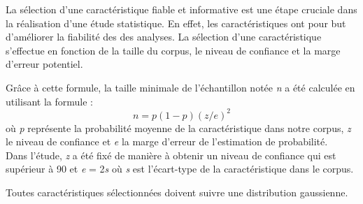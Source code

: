 \vspace{\baselineskip}
\hspace{0,5cm}La sélection d'une caractéristique fiable et informative est une étape cruciale
dans la réalisation d'une étude statistique. En effet, les caractéristiques ont
pour but d'améliorer la fiabilité des des analyses. La sélection d'une
caractéristique s'effectue en fonction de la taille du corpus, le niveau de
confiance et la marge d'erreur potentiel. 

\hspace{0,5cm} Grâce à cette formule, la taille minimale de l'échantillon notée \textit{n} a
été calculée en utilisant la formule :
\[n=p(1-p)(z/e)^2\]
où \textit{p} représente la probabilité moyenne de la caractéristique dans notre
corpus, \textit{z} le niveau de confiance et \textit{e} la marge d'erreur de
l'estimation de probabilité.
\\Dans l'étude, \textit{z} a été fixé de manière à obtenir un niveau de confiance
qui est supérieur à 90 et \textit{e} = 2\textit{s} où \textit{s} est
l'écart-type de la caractéristique dans le corpus.

\hspace{0,5cm}Toutes caractéristiques sélectionnées doivent suivre une
distribution gaussienne.
